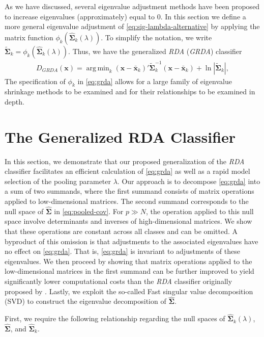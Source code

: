 \documentclass[11pt]{article}
\newcommand{\xbar}{\bar{\bm x}}
\DeclareMathOperator*{\argmin}{arg\,min}
\begin{document}
As we have discussed, several eigenvalue adjustment methods have been proposed to increase eigenvalues (approximately) equal to 0. In this section we define a more general eigenvalue adjustment of \eqref{eq:sig-lambda-alternative} by applying the matrix function $\phi_k(\widehat{\bm \Sigma}_k(\lambda))$. To simplify the notation, we write $\tilde{\bm \Sigma}_k = \phi_k(\widehat{\bm \Sigma}_k(\lambda))$. Thus, we have the generalized \emph{RDA} (\emph{GRDA}) classifier
\begin{align}
	D_{GRDA}(\bm x) = \argmin_{k}  (\bm x - \xbar_k)'\tilde{\bm\Sigma}_k^{-1}(\bm x - \xbar_k)  + \ln |\tilde{\bm\Sigma}_k|, \label{eq:grda}
\end{align}
The specification of $\phi_k$ in \eqref{eq:grda} allows for a large family of eigenvalue shrinkage methods to be examined and for their relationships to be examined in depth.

\section{The Generalized RDA Classifier}
In this section, we demonstrate that our proposed generalization of the \emph{RDA} classifier facilitates an efficient calculation of \eqref{eq:grda} as well as a rapid model selection of the pooling parameter $\lambda$. Our approach is to decompose \eqref{eq:grda} into a sum of two summands, where the first summand consists of matrix operations applied to low-dimensional matrices. The second summand corresponds to the null space of $\widehat{\bm \Sigma}$ in \eqref{eq:pooled-cov}. For $p \gg N$, the operation applied to this null space involve determinants and inverses of high-dimensional matrices. We show that these operations are constant across all classes and can be omitted. A byproduct of this omission is that adjustments to the associated eigenvalues have no effect on \eqref{eq:grda}. That is, \eqref{eq:grda} is invariant to adjustments of these eigenvalues. We then proceed by showing that matrix operations applied to the low-dimensional matrices in the first summand can be further improved to yield significantly lower computational costs than the \emph{RDA} classifier originally proposed by \cite{Friedman:1989tm}. Lastly, we exploit the so-called Fast singular value decomposition (SVD) to construct the eigenvalue decomposition of $\widehat{\bm \Sigma}$.

First, we require the following relationship regarding the null spaces of $\widehat{\bm \Sigma}_k(\lambda)$, $\widehat{\bm \Sigma}$, and $\widehat{\bm \Sigma}_k$.
\end{document}
